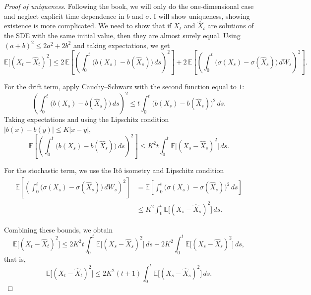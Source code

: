 \documentclass[11pt]{article}
\begin{document}
\begin{proof}[Proof of uniqueness] Following the book, we will only do the one-dimensional case and neglect explicit time dependence in $b$ and $\sigma$. I will show uniqueness, showing existence is more complicated. We need to show that if $X_t$ and $\hat{X}_t$ are solutions of the SDE with the same initial value, then they are almost surely equal. Using $(a+b)^2 \le 2a^2 + 2b^2$ and taking expectations, we get
\begin{equation}
\mathbb{E}\big[(X_t - \hat{X}_t)^2\big]
\le 
2\,\mathbb{E}\left[\left( \int_0^t \big(b(X_s) - b(\hat{X}_s)\big)\,ds\right)^2\right]
+
2\,\mathbb{E}\left[\left( \int_0^t \big(\sigma(X_s) - \sigma(\hat{X}_s)\big)\,dW_s\right)^2\right].
\end{equation}

For the drift term, apply Cauchy--Schwarz with the second function equal to $1$:
\begin{equation}
\left( \int_0^t \big(b(X_s) - b(\hat{X}_s)\big)\,ds \right)^2
\le 
t \int_0^t \big(b(X_s) - b(\hat{X}_s)\big)^2\,ds.
\end{equation}
Taking expectations and using the Lipschitz condition $|b(x)-b(y)| \le K|x-y|$,
\begin{equation}
\mathbb{E}\left[\left( \int_0^t \big(b(X_s) - b(\hat{X}_s)\big)\,ds \right)^2\right]
\le 
K^2 t \int_0^t \mathbb{E}\big[(X_s - \hat{X}_s)^2\big]\,ds.
\end{equation}

For the stochastic term, we use the It\^o isometry and  Lipschitz condition
\begin{align}
\mathbb{E}\left[\left( \int_0^t \big(\sigma(X_s) - \sigma(\hat{X}_s)\big)\,dW_s\right)^2\right]
&=
\mathbb{E}\left[ \int_0^t \big(\sigma(X_s) - \sigma(\hat{X}_s)\big)^2\,ds \right]\\
&\le
K^2 \int_0^t \mathbb{E}\big[(X_s - \hat{X}_s)^2\big]\,ds.
\end{align}

Combining these bounds, we obtain
\begin{equation}
\mathbb{E}\big[(X_t - \hat{X}_t)^2\big]
\le
2K^2 t \int_0^t \mathbb{E}\big[(X_s - \hat{X}_s)^2\big]\,ds
+
2K^2 \int_0^t \mathbb{E}\big[(X_s - \hat{X}_s)^2\big]\,ds,
\end{equation}
that is,
\begin{equation}
\mathbb{E}\big[(X_t - \hat{X}_t)^2\big]
\le
2K^2(t+1) \int_0^t \mathbb{E}\big[(X_s - \hat{X}_s)^2\big]\,ds.
\end{equation}


\end{proof}
\end{document}
